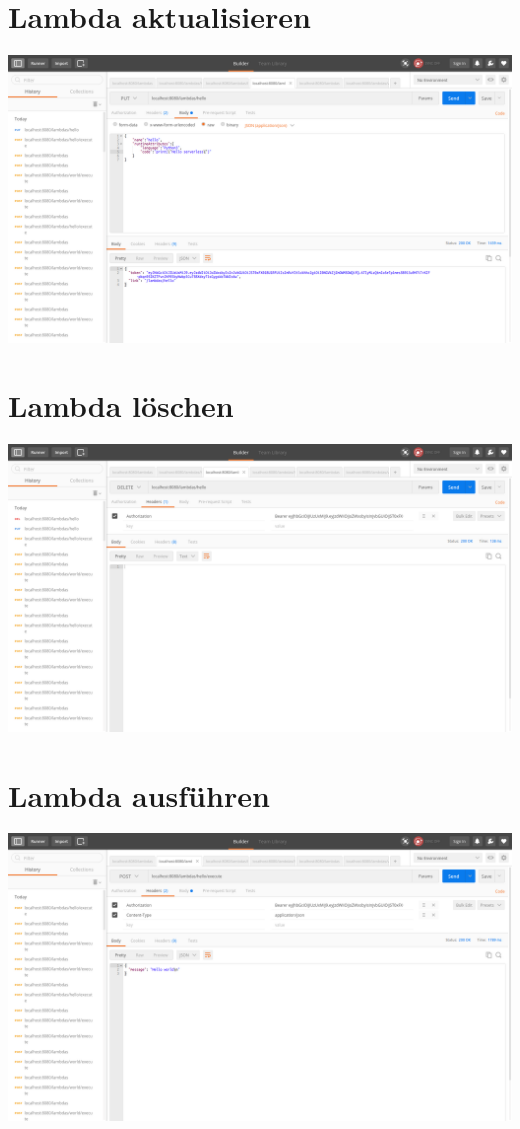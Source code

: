 \documentclass[a4paper,20pt,oneside]{book}
\begin{document}
	\section{Lambda aktualisieren}
	\includegraphics[width=\textwidth]{update.png}
	\section{Lambda löschen}
	\includegraphics[width=\textwidth]{delete.png}
	\section{Lambda ausführen}
	\includegraphics[width=\textwidth]{execute.png}
\end{document}
